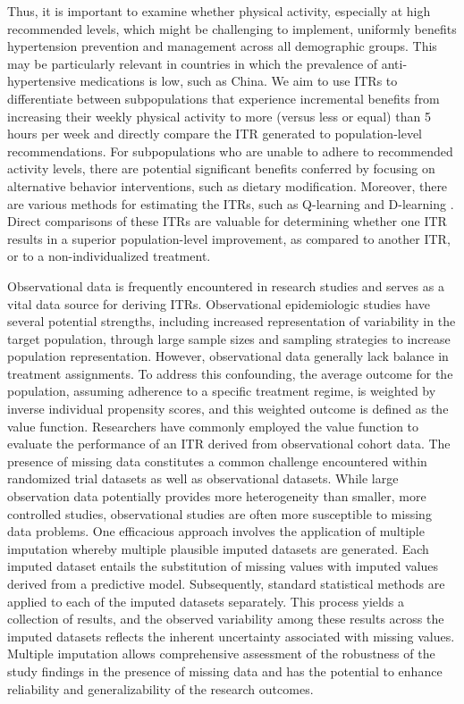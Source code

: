 \documentclass{article}
\begin{document}
Thus, it is important to examine whether physical activity, especially at high recommended levels, which might be challenging to implement, uniformly benefits hypertension prevention and management across all demographic groups. This may be particularly relevant in countries in which the prevalence of anti-hypertensive medications is low, such as China. We aim to use ITRs to differentiate between subpopulations that experience incremental benefits from increasing their weekly physical activity to more (versus less or equal) than 5 hours per week and directly compare the ITR generated to population-level recommendations. For subpopulations who are unable to adhere to recommended activity levels, there are potential significant benefits conferred by focusing on alternative behavior interventions, such as dietary modification. Moreover, there are various methods for estimating the ITRs, such as Q-learning and D-learning \citep{qian2011performance,tian2014simple}. Direct comparisons of these ITRs are valuable for determining whether one ITR results in a superior population-level improvement, as compared to another ITR, or to a non-individualized treatment.

Observational data is frequently encountered in research studies and serves as a vital data source for deriving ITRs. Observational epidemiologic studies have several potential strengths, including increased representation of variability in the target population, through large sample sizes and sampling strategies to increase population representation. However, observational data generally lack balance in treatment assignments. To address this confounding, the average outcome for the population, assuming adherence to a specific treatment regime, is weighted by inverse individual propensity scores, and this weighted outcome is defined as the value function. Researchers have commonly employed the value function to evaluate the performance of an ITR derived from observational cohort data. The presence of missing data constitutes a common challenge encountered within randomized trial datasets as well as observational datasets. While large observation data potentially provides more heterogeneity than smaller, more controlled studies, observational studies are often more susceptible to missing data problems. One efficacious approach involves the application of multiple imputation \cite{sterne2009multiple} whereby multiple plausible imputed datasets are generated. Each imputed dataset entails the substitution of missing values with imputed values derived from a predictive model. Subsequently, standard statistical methods are applied to each of the imputed datasets separately. This process yields a collection of results, and the observed variability among these results across the imputed datasets reflects the inherent uncertainty associated with missing values. Multiple imputation allows comprehensive assessment of the robustness of the study findings in the presence of missing data and has the potential to enhance reliability and generalizability of the research outcomes.
\end{document}
